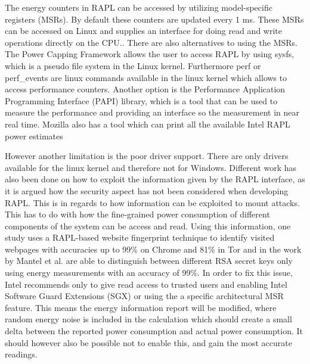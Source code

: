 



The energy counters in RAPL can be accessed by utilizing model-specific registers (MSRs). By default these counters are updated every 1 ms. These MSRs can be accessed on Linux and supplies an interface for doing read and write operations directly on the CPU.\cite{linux_manual_msr}. There are also alternatives to using the MSRs. The Power Capping Framework allows the user to access RAPL by using sysfs, which is a pseudo file system in the Linux kernel\cite{PowerCappingFramework,RAPL_in_action}. Furthermore perf or perf\_events are linux commands available in the linux kernel which allows to access performance counters.\cite{Perf_events,RAPL_in_action} 
Another option is the Performance Application Programming Interface (PAPI) library, which is a tool that can be used to measure the performance and providing an interface so the measurement in near real time\cite{PAPI}.
Mozilla also has a tool which can print all the available Intel RAPL power estimates\cite{FireFox}\nytafsnit





However another limitation is the poor driver support. There are only drivers available for the linux kernel and therefore not for Windows.\cite{RAPL_in_action}   Different work has also been done on how to exploit the information given by the RAPL interface, as it is argued how the security aspect has not been considered when developing RAPL\cite[]{Zhang2021}. This is in regards to how information can be exploited to mount attacks. This has to do with how the fine-grained power consumption of different components of the system can be access and read. Using this information, one study uses a RAPL-based website fingerprint technique to identify visited webpages with accuracies up to 99\% on Chrome and 81\% in Tor\cite[]{Zhang2021} and in the work by Mantel et al.\cite[]{Mantel2018} are able to distinguish between different RSA secret keys only using energy measurements with an accuracy of 99\%. In order to fix this issue, Intel recommends only to give read access to trusted users and enabling Intel Software Guard Extensions (SGX) or using the a specific architectural MSR feature. This means the energy information report will be modified, where random energy noise is included in the calculation which should create a small delta between the reported power consumption and actual power consumption. It should however also be possible not to enable this, and gain the most accurate readings.\cite[]{intel_rapl_security}

